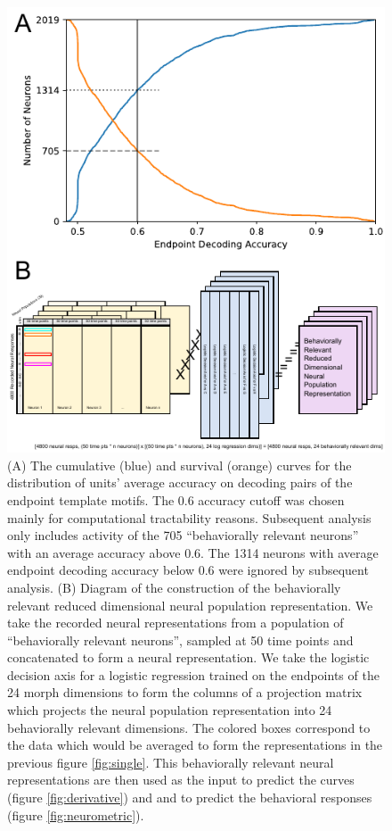 \begin{figure}[tbp] 
  \centering
  \includegraphics[width=114mm]{figures/fig06_neural_rep.pdf}
  \caption[Behaviorally relevant neural representation]
{
(A) The cumulative (blue) and survival (orange) curves for the distribution of units’ average accuracy on decoding pairs of the endpoint template motifs. The 0.6 accuracy cutoff was chosen mainly for computational tractability reasons. Subsequent analysis only includes activity of the 705 “behaviorally relevant neurons” with an average accuracy above 0.6. The 1314 neurons with average endpoint decoding accuracy below 0.6 were ignored by subsequent analysis.
(B) Diagram of the construction of the behaviorally relevant reduced dimensional neural population representation. We take the recorded neural representations from a population of “behaviorally relevant neurons”, sampled at 50 time points and concatenated to form a neural representation. We take the logistic decision axis for a logistic regression trained on the endpoints of the 24 morph dimensions to form the columns of a projection matrix which projects the neural population representation into 24 behaviorally relevant dimensions. The colored boxes correspond to the data which would be averaged to form the representations in the previous figure \ref{fig:single}. This behaviorally relevant neural representations are then used as the input to predict the \Thielk curves (figure \ref{fig:derivative}) and and to predict the behavioral responses (figure \ref{fig:neurometric}). 
}
  \label{fig:neural_rep}
\end{figure}